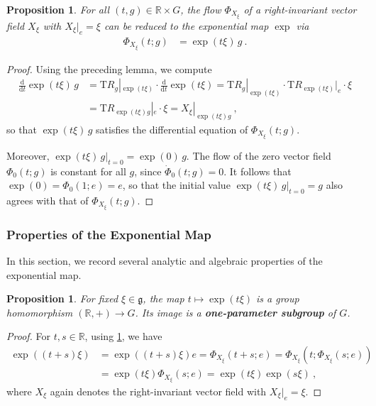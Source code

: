 \documentclass[10pt,a4paper]{article}
\theoremstyle{mytheorem}
\newtheorem{proposition}[theorem]{Proposition}
\theoremstyle{mydefinition}
\newcommand{\mydef}[1]{\textbf{\textit{#1}}}
\newcommand{\dt}{\mathrm{d}}
\newcommand{\Tt}{\mathrm{T}}
\begin{document}
\begin{proposition}
\label{th:PhiFromExp}
For all $(t,g)\in\mathbb{R}\times G$, the flow $\Phi_{X_\xi}$ of a right-invariant vector field $X_\xi$ with $X_\xi|_e=\xi$ can be reduced to the exponential map $\exp$ via
\begin{align*}
	\Phi_{X_\xi}(t;g)
	&= \exp(t\xi)\,g
	\ .
\end{align*}
\end{proposition}
\begin{proof}
Using the preceding lemma, we compute
\begin{align*}
	\frac{\dt}{\dt t}\exp(t\xi)\,g
	&=
	\Tt R_g|_{\exp(t\xi)}\cdot\frac{\dt}{\dt t}\exp(t\xi)
	=
	\Tt R_g|_{\exp(t\xi)}\cdot\Tt R_{\exp(t\xi)}|_e\cdot\xi
	\nonumber\\
	&=
	\Tt R_{\exp(t\xi)g}|_e\cdot\xi = X_\xi|_{\exp(t\xi)g}
	\ ,
\end{align*}
so that $\exp(t\xi)\,g$ satisfies the differential equation of $\Phi_{X_\xi}(t;g)$.

Moreover, $\exp(t\xi)\,g|_{t=0}=\exp(0)\,g$.
The flow of the zero vector field $\Phi_0(t; g)$ is constant for all $g$, since $\dot{\Phi}_0(t; g)=0$. It follows that $\exp(0)=\Phi_0(1; e)=e$, so that the initial value $\exp(t\xi)\,g|_{t=0}=g$ also agrees with that of $\Phi_{X_\xi}(t;g)$.
\end{proof}

\subsubsection{Properties of the Exponential Map}

In this section, we record several analytic and algebraic properties of the exponential map.

\begin{proposition}
For fixed $\xi\in\mathfrak{g}$, the map $t\mapsto\exp(t\xi)$ is a group homomorphism $(\mathbb{R},+)\rightarrow G$.
Its image is a \mydef{one-parameter subgroup} of $G$.
\end{proposition}
\begin{proof}
For $t,s\in\mathbb{R}$, using \ref{th:PhiFromExp}, we have
\begin{align*}
	\exp((t+s)\xi)
	&= \exp((t+s)\xi)e
	= \Phi_{X_\xi}(t+s;e)
	= \Phi_{X_\xi}(t; \Phi_{X_\xi}(s;e))
	\nonumber\\
	&= \exp(t\xi)\Phi_{X_\xi}(s;e) = \exp(t\xi)\exp(s\xi)
	\ ,
\end{align*}
where $X_\xi$ again denotes the right-invariant vector field with $X_\xi|_e=\xi$.
\end{proof}
\end{document}

